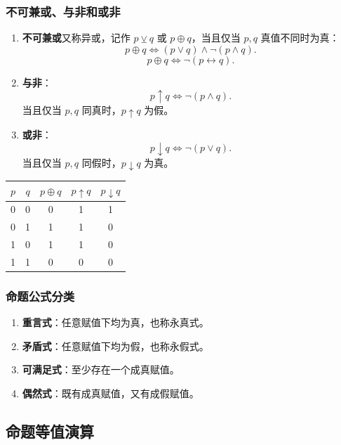 \subsubsection{不可兼或、与非和或非}

\begin{enumerate}
	\item \textbf{不可兼或}又称异或，记作 \(p\veebar q\) 或 \(p\oplus q\)，当且仅当 \(p,q\) 真值不同时为真：
	\[
	p\oplus q\Leftrightarrow (p\lor q)\land\neg(p\land q).
	\]
	\[
	p\oplus q\Leftrightarrow \neg(p\leftrightarrow q).
	\]
	\item \textbf{与非}：
	\[
	p\uparrow q\Leftrightarrow \neg(p\land q).
	\]
	当且仅当 \(p,q\) 同真时，\(p\uparrow q\) 为假。
	\item \textbf{或非}：
	\[
	p\downarrow q\Leftrightarrow \neg(p\lor q).
	\]
	当且仅当 \(p,q\) 同假时，\(p\downarrow q\) 为真。
\end{enumerate}

\begin{center}
	\begin{tabular}{ccccc}
		\toprule
		\(p\)&\(q\)&\(p\oplus q\)&\(p\uparrow q\)&\(p\downarrow q\)\\
		\midrule
		0&0&0&1&1\\
		0&1&1&1&0\\
		1&0&1&1&0\\
		1&1&0&0&0\\
		\bottomrule
	\end{tabular}
\end{center}

\subsubsection{命题公式分类}

\begin{enumerate}
	\item \textbf{重言式}：任意赋值下均为真，也称永真式。
	\item \textbf{矛盾式}：任意赋值下均为假，也称永假式。
	\item \textbf{可满足式}：至少存在一个成真赋值。
	\item \textbf{偶然式}：既有成真赋值，又有成假赋值。
\end{enumerate}

\subsection{命题等值演算}

